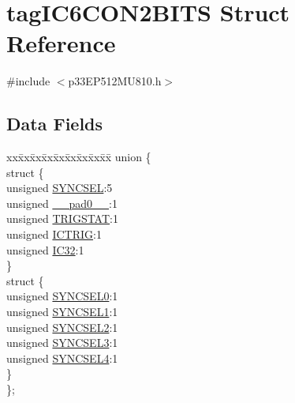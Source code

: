 \hypertarget{structtag_i_c6_c_o_n2_b_i_t_s}{}\section{tag\+I\+C6\+C\+O\+N2\+B\+I\+TS Struct Reference}
\label{structtag_i_c6_c_o_n2_b_i_t_s}


{\ttfamily \#include $<$p33\+E\+P512\+M\+U810.\+h$>$}

\subsection*{Data Fields}
\begin{DoxyCompactItemize}
\item 
\begin{tabbing}
xx\=xx\=xx\=xx\=xx\=xx\=xx\=xx\=xx\=\kill
union \{\\
\>struct \{\\
\>\>unsigned \hyperlink{structtag_i_c6_c_o_n2_b_i_t_s_a35fbbe11485c2615ed27535b62c3fa35}{SYNCSEL}:5\\
\>\>unsigned \hyperlink{structtag_i_c6_c_o_n2_b_i_t_s_adf71f3d8410c1f1dbbc96680a92c49af}{\_\_pad0\_\_}:1\\
\>\>unsigned \hyperlink{structtag_i_c6_c_o_n2_b_i_t_s_ab379549de54ac93ad4aa73686c34cb7c}{TRIGSTAT}:1\\
\>\>unsigned \hyperlink{structtag_i_c6_c_o_n2_b_i_t_s_a79bd14cfd2e403f3a96ce0b3bb58097b}{ICTRIG}:1\\
\>\>unsigned \hyperlink{structtag_i_c6_c_o_n2_b_i_t_s_afc705120246cb4ca0c93c87817519b7f}{IC32}:1\\
\>\} \\
\>struct \{\\
\>\>unsigned \hyperlink{structtag_i_c6_c_o_n2_b_i_t_s_a3b5df3154fde5141e6ac0156425ff8b4}{SYNCSEL0}:1\\
\>\>unsigned \hyperlink{structtag_i_c6_c_o_n2_b_i_t_s_a50e73f95ab1c258ddc64f69c0991deaf}{SYNCSEL1}:1\\
\>\>unsigned \hyperlink{structtag_i_c6_c_o_n2_b_i_t_s_a304907a5d2c4cbf1114a54642a85951e}{SYNCSEL2}:1\\
\>\>unsigned \hyperlink{structtag_i_c6_c_o_n2_b_i_t_s_a6bbd1bd2ead6c9fa713969c6eb0f0c75}{SYNCSEL3}:1\\
\>\>unsigned \hyperlink{structtag_i_c6_c_o_n2_b_i_t_s_a0cd5bbe196c7974953909d27a6307bb7}{SYNCSEL4}:1\\
\>\} \\
\}; \\

\end{tabbing}\end{DoxyCompactItemize}


